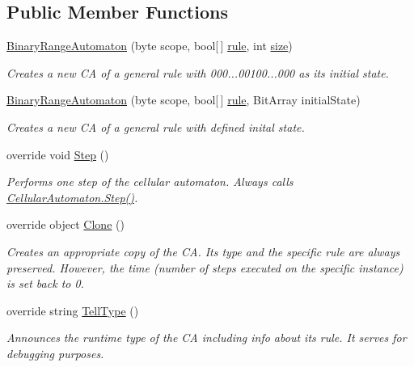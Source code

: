 \subsection*{Public Member Functions}
\begin{DoxyCompactItemize}
\item 
\hyperlink{class_cellular_1_1_binary_range_automaton_a3b165a9e98e516bf7e9bdb8bb2fe16a7}{Binary\+Range\+Automaton} (byte scope, bool\mbox{[}$\,$\mbox{]} \hyperlink{class_cellular_1_1_binary_range_automaton_a4dda99c3151599c8ef12d08d7472144c}{rule}, int \hyperlink{class_cellular_1_1_automaton1_d_a915129ccf0f1e7092844c99ce6a28e5b}{size})
\begin{DoxyCompactList}\small\item\em Creates a new C\+A of a general rule with 000...00100...000 as its initial state. \end{DoxyCompactList}\item 
\hyperlink{class_cellular_1_1_binary_range_automaton_a704950c30ff58c587c8a717f9f2c839b}{Binary\+Range\+Automaton} (byte scope, bool\mbox{[}$\,$\mbox{]} \hyperlink{class_cellular_1_1_binary_range_automaton_a4dda99c3151599c8ef12d08d7472144c}{rule}, Bit\+Array initial\+State)
\begin{DoxyCompactList}\small\item\em Creates a new C\+A of a general rule with defined inital state. \end{DoxyCompactList}\item 
override void \hyperlink{class_cellular_1_1_binary_range_automaton_ade1f5b831b9676f04f835c33d245b9e2}{Step} ()
\begin{DoxyCompactList}\small\item\em Performs one step of the cellular automaton. Always calls {\ttfamily \hyperlink{class_cellular_1_1_cellular_automaton_aa70848d58015575974bc875ac5a89ae7}{Cellular\+Automaton.\+Step()}}. \end{DoxyCompactList}\item 
override object \hyperlink{class_cellular_1_1_binary_range_automaton_a12f010562e04785e0a7efb113302687e}{Clone} ()
\begin{DoxyCompactList}\small\item\em Creates an appropriate copy of the C\+A. Its type and the specific rule are always preserved. However, the time (number of steps executed on the specific instance) is set back to 0. \end{DoxyCompactList}\item 
override string \hyperlink{class_cellular_1_1_binary_range_automaton_afad205eb4fea51efd63b063f96bfda5c}{Tell\+Type} ()
\begin{DoxyCompactList}\small\item\em Announces the runtime type of the C\+A including info about its rule. It serves for debugging purposes. \end{DoxyCompactList}\end{DoxyCompactItemize}
